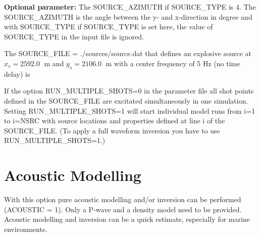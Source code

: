 \textbf{Optional parameter:} The SOURCE\_AZIMUTH if SOURCE\_TYPE is 4. The SOURCE\_AZIMUTH is the angle between the y- and x-direction in degree and with SOURCE\_TYPE if SOURCE\_TYPE is set here, the value of SOURCE\_TYPE in the input file is ignored.

The SOURCE\_FILE = ./sources/source.dat that defines an explosive source  at $x_s=2592.0\;$ m and $y_s=2106.0\;$ m with
a center frequency of 5 Hz (no time delay) is
{\color{blue}{\begin{verbatim}
	2592.0        0.0        2106.0        0.0           5.0           1.0
\end{verbatim}}}

If the option RUN\_MULTIPLE\_SHOTS=0 in the parameter file all shot points defined in the SOURCE\_FILE are excitated simultaneously in one simulation. Setting RUN\_MULTIPLE\_SHOTS=1 will start individual model runs from i=1 to i=NSRC with source locations and properties defined at line i of the SOURCE\_FILE. (To apply a full waveform inversion you have to use RUN\_MULTIPLE\_SHOTS=1.) 

% 

\newpage


\section{Acoustic Modelling}
\label{ac_mod}
{\color{blue}{\begin{verbatim}
"Acoustic Computation" : "comment",
			"ACOUSTIC" : "1",
\end{verbatim}}}

{\color{red}{\begin{verbatim}
Default value is:
	ACOUSTIC=0
\end{verbatim}}}

With this option pure acoustic modelling and/or inversion can be performed (ACOUSTIC = 1). Only a P-wave and a density model need to be provided. Acoustic modelling and inversion can be a quick estimate, especially for marine environments.

